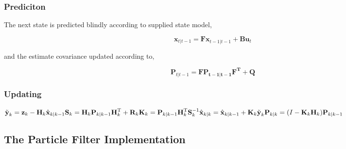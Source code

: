 \subsubsection{Prediciton}
The next state is predicted blindly according to supplied state model,

\begin{equation}
\mathbf{x}_{t|t-1} = \mathbf{Fx}_{t-1|t-1} + \mathbf{Bu}_{t}
\end{equation}

and the estimate covariance updated according to,

\begin{equation}
\mathbf{P}_{t|t-1} = \mathbf{FP_{t-1|t-1}F^{T}} + \mathbf{Q}
\end{equation}

\subsubsection{Updating}

\begin{math}
\tilde{\textbf{y}}_k = \textbf{z}_k - \textbf{H}_k\hat{\textbf{x}}_{k|k-1}\\
\textbf{S}_k = \textbf{H}_k \textbf{P}_{k|k-1} \textbf{H}_k^\text{T} + \textbf{R}_k\\
\textbf{K}_k = \textbf{P}_{k|k-1}\textbf{H}_k^\text{T}\textbf{S}_k^{-1}\\
\hat{\textbf{x}}_{k|k} = \hat{\textbf{x}}_{k|k-1} + \textbf{K}_k\tilde{\textbf{y}}_k\\
\textbf{P}_{k|k} = (I - \textbf{K}_k \textbf{H}_k) \textbf{P}_{k|k-1}
\end{math}

\subsection{The Particle Filter Implementation}

    